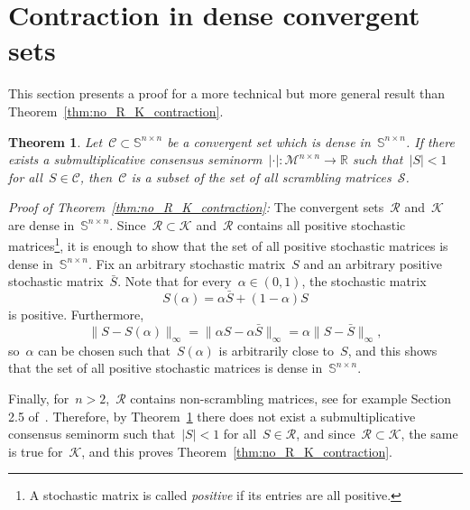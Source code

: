 \documentclass[letterpaper, 10 pt, conference]{ieeeconf}  %
\newtheorem{theorem}{Theorem}
\newcommand{\R}{\mathbb R}
\newcommand{\gensn}[1]{|#1|} %
\newcommand{\eqrowsum}{\mathcal{M}} %
\newcommand{\stoc}{\mathbb{S}} %
\newcommand{\stocpd}{\mathcal{R}} %
\newcommand{\stocsary}{\mathcal{K}} %
\newcommand{\stocscr}{\mathcal{S}} %
\begin{document}
\section{Contraction in dense convergent sets}

This section presents a proof for a more technical but more general result than Theorem~\ref{thm:no_R_K_contraction}.
\begin{theorem}\label{thm:contraction_iff}
    Let~$\mathcal{C} \subset \stoc^{n \times n}$ be a convergent set which is dense in~$\stoc^{n \times n}$. If there exists a submultiplicative consensus seminorm~$\gensn{\cdot} : \eqrowsum^{n \times n} \to \R$ such that~$\gensn{S} < 1$ for all~$S \in \mathcal{C}$, then~$\mathcal{C}$ is a subset of the set of all scrambling matrices~$\stocscr$.
\end{theorem}

\textit{Proof of Theorem~\ref{thm:no_R_K_contraction}:}
    The convergent sets~$\stocpd$ and~$\stocsary$ are dense in~$\stoc^{n \times n}$. Since~$\stocpd \subset \stocsary$ and~$\stocpd$ contains all positive stochastic matrices\footnote{A stochastic matrix is called \emph{positive} if its entries are all positive.}, it is enough to show that the set of all positive stochastic matrices is dense in~$\stoc^{n \times n}$. Fix an arbitrary stochastic matrix~$S$ and an arbitrary positive stochastic matrix~$\bar S$. Note that for every~$\alpha \in (0,1)$, the stochastic matrix
    \begin{equation}
        S(\alpha) = \alpha \bar S + (1-\alpha)S
    \end{equation}
    is positive. Furthermore,
    \begin{equation}
        \|S - S(\alpha)\|_\infty = \|\alpha S - \alpha \bar S\|_\infty = \alpha \|S - \bar S\|_\infty,
    \end{equation}
    so~$\alpha$ can be chosen such that~$S(\alpha)$ is arbitrarily close to~$S$, and this shows that the set of all positive stochastic matrices is dense in~$\stoc^{n \times n}$.

    Finally, for~$n > 2$,~$\stocpd$ contains non-scrambling matrices, see for example Section 2.5 of~\cite{Cao2008ConsensusGraphical}. Therefore, by Theorem~\ref{thm:contraction_iff} there does not exist a submultiplicative consensus seminorm such that~$\gensn{S} < 1$ for all~$S \in \stocpd$, and since~$\stocpd \subset \stocsary$, the same is true for~$\stocsary$, and this proves Theorem~\ref{thm:no_R_K_contraction}.
    \hspace*{\fill}~\QED
\end{document}
